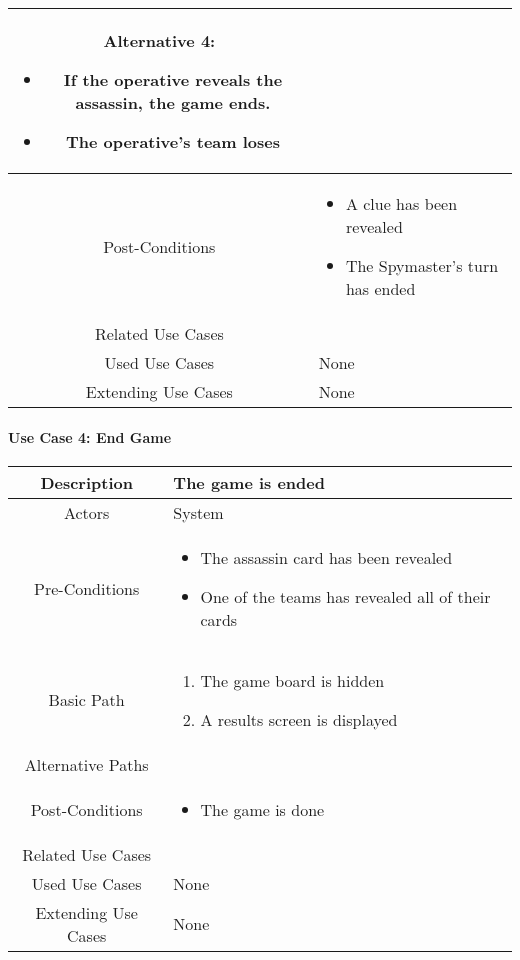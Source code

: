 \documentclass[12pt, a4paper]{article}
\begin{document}
\begin{center}
\begin{tabular}{ |c|p{7cm}| }
		Alternative 4:
		\begin{itemize}
			\item If the operative reveals the assassin, the game ends.
			\item The operative’s team loses  
		\end{itemize}
				\\
				\hline 
				Post-Conditions & 
				\begin{itemize}
					\item A clue has been revealed
					\item The Spymaster’s turn has ended 
				\end{itemize} \\
				\hline 
				Related Use Cases & \\
				\hline 
				Used Use Cases & None \\
				\hline
				Extending Use Cases & None \\
				\hline
			\end{tabular}
		\end{center}
			
			\paragraph{Use Case 4: End Game}
			\begin{center}
				\begin{tabular}{ |c|p{7cm}| } 
					\hline
					Description & The game is ended \\ 
					\hline
					Actors & System  \\
					\hline 
					Pre-Conditions & \begin{itemize}	
						\item The assassin card has been revealed 
						\item One of the teams has revealed all of their cards
					\end{itemize}	
					\\
					\hline
					Basic Path & 
					\begin{enumerate}
						\item The game board is hidden
						\item A results screen is displayed   
					\end{enumerate} \\
					\hline 
					Alternative Paths & 
					\\
					\hline 
					Post-Conditions & 
					\begin{itemize}
						\item The game is done
						
					\end{itemize} \\
					\hline 
					Related Use Cases & \\
					\hline 
					Used Use Cases & None \\
					\hline
					Extending Use Cases & None \\
					\hline
				\end{tabular}
			\end{center}
	
\end{document}
